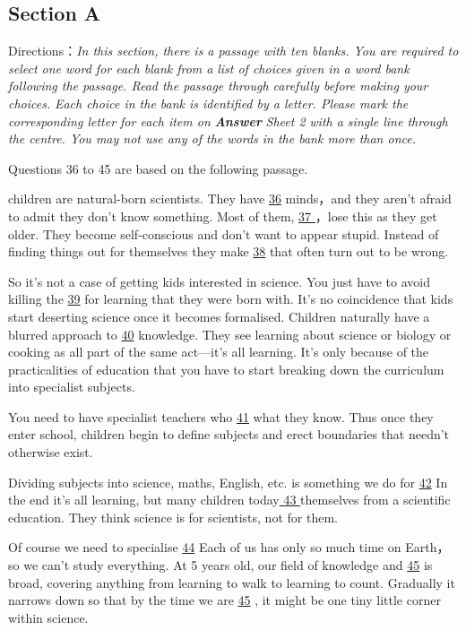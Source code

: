 \documentclass[UTF8,11pt]{ctexart}
\begin{document}
\subsection*{\textbf{Section A}}


Directions：\textit{In this section, there is a passage with ten blanks. You are required to select one word for each blank from a} \textit{list of choices given in a word bank following the passage. Read the passage through carefully before making your choices.} \textit{Each choice in the bank is identified by a letter. Please mark the corresponding letter for each item on}\textbf{\textit{ Answer}}\textit{ Sheet 2} \textit{with a single line through the centre. You may not use any of the words in the bank more than once.}


Questions 36 to 45 are based on the following passage.


children are natural-born scientists. They have \uline{36} minds，and they aren’t afraid to admit they don’t know something. Most of them, \uline{37 }，lose this as they get older. They become self-conscious and don’t want to appear stupid. Instead of finding things out for themselves they make \uline{38} that often turn out to be wrong.


So it’s not a case of getting kids interested in science. You just have to avoid killing the \uline{39} for learning that they were born with. It’s no coincidence that kids start deserting science once it becomes formalised. Children naturally have a blurred approach to \uline{40} knowledge. They see learning about science or biology or cooking as all part of the same act—it’s all learning. It’s only because of the practicalities of education that you have to start breaking down the curriculum into specialist subjects.


You need to have specialist teachers who \uline{41} what they know. Thus once they enter school, children begin to define subjects and erect boundaries that needn’t otherwise exist.


Dividing subjects into science, maths, English, etc. is something we do for \uline{42} In the end it’s all learning, but many children today\uline{ 43 }themselves from a scientific education. They think science is for scientists, not for them.


Of course we need to specialise \uline{44} Each of us has only so much time on Earth，so we can’t study everything. At 5 years old, our field of knowledge and \uline{45} is broad, covering anything from learning to walk to learning to count. Gradually it narrows down so that by the time we are \uline{45} , it might be one tiny little corner within science. 
\end{document}
